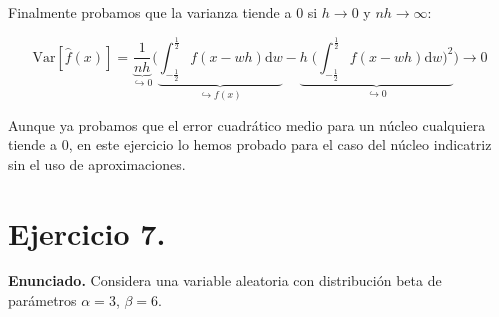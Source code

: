 \documentclass[a4paper]{article}
\newcommand{\Var}{\text{Var}}
\begin{document}
Finalmente probamos que la varianza tiende a $0$ si $h \rightarrow 0$ y $nh \rightarrow \infty$:

\[
	\Var [ \hat f(x)] = \underbrace{\frac{1}{n h}}_{\hookrightarrow 0} \bigg( \underbrace{\int_{-\frac{1}{2}}^{\frac{1}{2}} f(x - wh) \text{d}w}_{\hookrightarrow f(x)} - \underbrace{h \; \bigg( \int_{-\frac{1}{2}}^{\frac{1}{2}} f(x - wh) \text{d}w\bigg) ^2}_{\hookrightarrow 0} \bigg)
	\longrightarrow 0
\]

Aunque ya probamos que el error cuadrático medio para un núcleo cualquiera tiende a $0$, en este ejercicio lo hemos probado para el caso del núcleo indicatriz sin el uso de aproximaciones.

\section*{Ejercicio 7.}

\textbf{Enunciado.} Considera una variable aleatoria con distribución beta de parámetros $\alpha = 3$, $\beta = 6$.
\end{document}
